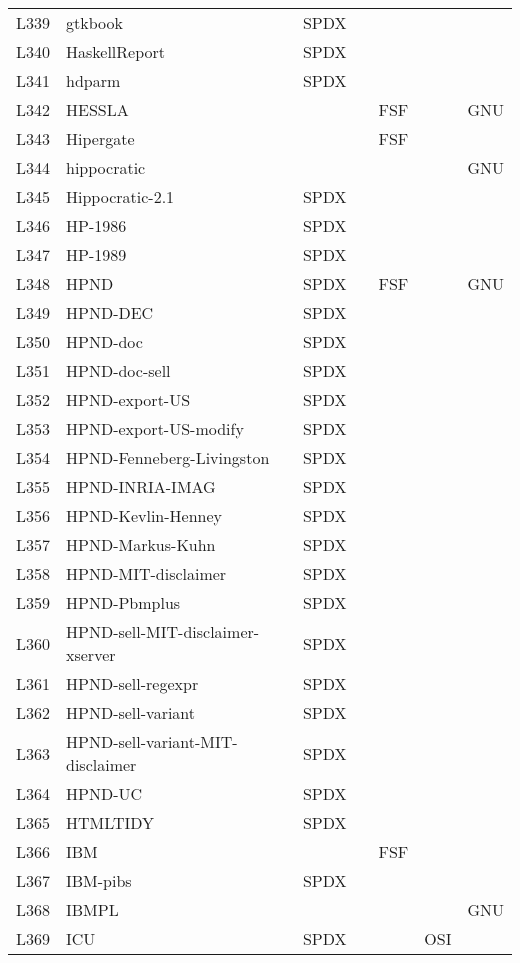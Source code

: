 \begin{longtable}[h]{m{2cm} | m{7cm} | c | c | c | c | c}
  L339 & gtkbook & SPDX &  &  &  &  \\
  L340 & HaskellReport & SPDX &  &  &  &  \\
  L341 & hdparm & SPDX &  &  &  &  \\
  L342 & HESSLA &  &  & FSF &  & GNU \\
  L343 & Hipergate &  &  & FSF &  &  \\
  L344 & hippocratic &  &  &  &  & GNU \\
  L345 & Hippocratic-2.1 & SPDX &  &  &  &  \\
  L346 & HP-1986 & SPDX &  &  &  &  \\
  L347 & HP-1989 & SPDX &  &  &  &  \\
  L348 & HPND & SPDX &  & FSF &  & GNU \\
  L349 & HPND-DEC & SPDX &  &  &  &  \\
  L350 & HPND-doc & SPDX &  &  &  &  \\
  L351 & HPND-doc-sell & SPDX &  &  &  &  \\
  L352 & HPND-export-US & SPDX &  &  &  &  \\
  L353 & HPND-export-US-modify & SPDX &  &  &  &  \\
  L354 & HPND-Fenneberg-Livingston & SPDX &  &  &  &  \\
  L355 & HPND-INRIA-IMAG & SPDX &  &  &  &  \\
  L356 & HPND-Kevlin-Henney & SPDX &  &  &  &  \\
  L357 & HPND-Markus-Kuhn & SPDX &  &  &  &  \\
  L358 & HPND-MIT-disclaimer & SPDX &  &  &  &  \\
  L359 & HPND-Pbmplus & SPDX &  &  &  &  \\
  L360 & HPND-sell-MIT-disclaimer-xserver & SPDX &  &  &  &  \\
  L361 & HPND-sell-regexpr & SPDX &  &  &  &  \\
  L362 & HPND-sell-variant & SPDX &  &  &  &  \\
  L363 & HPND-sell-variant-MIT-disclaimer & SPDX &  &  &  &  \\
  L364 & HPND-UC & SPDX &  &  &  &  \\
  L365 & HTMLTIDY & SPDX &  &  &  &  \\
  L366 & IBM &  &  & FSF &  &  \\
  L367 & IBM-pibs & SPDX &  &  &  &  \\
  L368 & IBMPL &  &  &  &  & GNU \\
  L369 & ICU & SPDX &  &  & OSI &  \\

\end{longtable}
